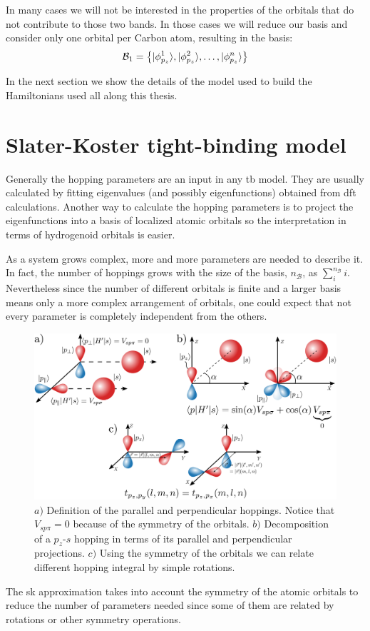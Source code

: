 In many cases we will not be interested in the properties of the orbitals that do not contribute to those two bands. In those cases we will reduce our basis and consider only one orbital per Carbon atom, resulting in the basis:
\begin{equation}
  \mathcal{B}_1 = \left\{|\phi^1_{p_z}\rangle, |\phi^2_{p_z}\rangle,\dots, |\phi^n_{p_z}\rangle\right\}
\label{basis1}
\end{equation}

In the next section we show the details of the model used to build the Hamiltonians used all along this thesis.


\section{Slater-Koster tight-binding model}
\label{ssec:SK}
Generally the hopping parameters are an input in any \ac{tb} model. They are usually calculated by fitting eigenvalues (and possibly eigenfunctions) obtained from \ac{dft} calculations. Another way to calculate the hopping parameters is to project the eigenfunctions into a basis of localized atomic orbitals so the interpretation in terms of hydrogenoid orbitals is easier.

As a system grows complex, more and more parameters are needed to describe it. In fact, the number of hoppings grows with the size of the basis, $n_\mathcal{B}$, as $\sum^{n_\mathcal{B}}_i i$. Nevertheless since the number of different orbitals is finite and a larger basis means only a more complex arrangement of orbitals, one could expect that not every parameter is completely independent from the others.
\begin{figure}[h!]
\centering
\includegraphics{graphene/figures/hoppings.pdf}
\vspace{-10pt}
\caption{$a)$ Definition of the parallel and perpendicular hoppings. Notice that $V_{sp\pi}=0$ because of the symmetry of the orbitals. $b)$ Decomposition of a $p_z$-$s$ hopping in terms of its parallel and perpendicular projections. $c)$ Using the symmetry of the orbitals we can relate different hopping integral by simple rotations.}
\label{fig:SK}
\end{figure}
\FloatBarrier
The \ac{sk} approximation\cite{Slater1954} takes into account the symmetry of the atomic orbitals to reduce the number of parameters needed since some of them are related by rotations or other symmetry operations.

